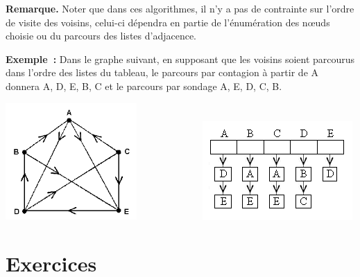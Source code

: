 			\textbf{Remarque.} Noter que dans ces algorithmes, il n'y a pas 
			de contrainte sur l'ordre de visite des voisins, celui-ci
			dépendra en partie de l'énumération des n{\oe}uds 
			choisie ou du parcours des listes d'adjacence.

			\textbf{Exemple~:} Dans le graphe suivant, en supposant que les 
			voisins soient parcourus dans l'ordre des listes du tableau, le
			parcours par contagion à partir de A donnera A, D, E, B, C et 
			le parcours par sondage A, E, D, C, B.

			\begin{center}
			\includegraphics[width=4.99cm,height=4.473cm]{image/a2012Logique2eme-img054.png}  \ \ \ \ \ \ \ \ \ \ \ \ \ 
			\includegraphics[width=5.715cm,height=3.784cm]{image/a2012Logique2eme-img055.png} 
			\end{center}


\section{Exercices}

